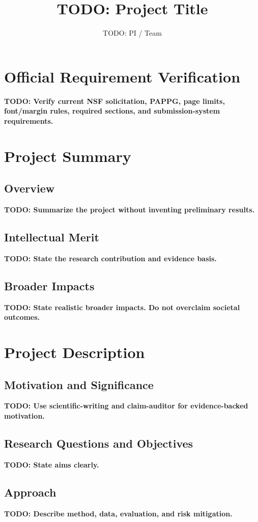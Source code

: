 \documentclass[11pt]{article}
\title{TODO: Project Title}
\author{TODO: PI / Team}
\date{}
\newcommand{\todo}[1]{\textbf{TODO: #1}}
\begin{document}
\maketitle

\section*{Official Requirement Verification}

\todo{Verify current NSF solicitation, PAPPG, page limits, font/margin rules, required sections, and submission-system requirements.}

\section*{Project Summary}

\subsection*{Overview}
\todo{Summarize the project without inventing preliminary results.}

\subsection*{Intellectual Merit}
\todo{State the research contribution and evidence basis.}

\subsection*{Broader Impacts}
\todo{State realistic broader impacts. Do not overclaim societal outcomes.}

\section{Project Description}

\subsection{Motivation and Significance}
\todo{Use scientific-writing and claim-auditor for evidence-backed motivation.}

\subsection{Research Questions and Objectives}
\todo{State aims clearly.}

\subsection{Approach}
\todo{Describe method, data, evaluation, and risk mitigation.}
\end{document}
